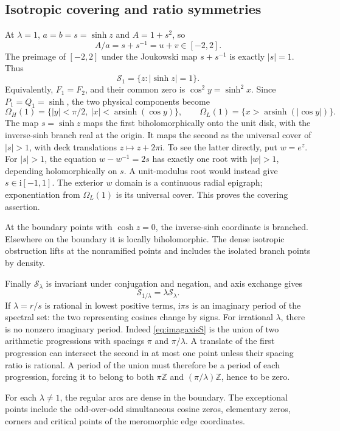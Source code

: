 \documentclass[11pt]{article}
\numberwithin{equation}{section}
\theoremstyle{definition}
\newcommand{\Z}{\mathbb Z}
\newcommand{\ii}{\mathrm i}
\newcommand{\cS}{\mathcal S}
\newcommand{\OH}{\Omega_H}
\newcommand{\OL}{\Omega_L}
\begin{document}
\subsection{Isotropic covering and ratio symmetries}

At \(\lambda=1\), \(a=b=s=\sinh z\) and \(A=1+s^2\), so
\[
 A/a=s+s^{-1}=u+v\in[-2,2].
\]
The preimage of \([-2,2]\) under the Joukowski map \(s+s^{-1}\)
is exactly \(|s|=1\). Thus
\begin{equation}\label{eq:isotropicgeometry}
 \cS_1=\{z:|\sinh z|=1\}.
\end{equation}
Equivalently, \(F_1=F_2\), and their common zero is
\(\cos^2 y=\sinh^2x\). Since \(P_1=Q_1=\sinh\), the two physical
components become
\[
 \OH(1)=\{|y|<\pi/2,\ |x|<\operatorname{arsinh}(\cos y)\},
 \qquad
 \OL(1)=\{x>\operatorname{arsinh}(|\cos y|)\}.
\]
The map \(s=\sinh z\) maps the first biholomorphically onto the unit
disk, with the inverse-sinh branch real at the origin. It maps the
second as the universal cover of \(|s|>1\), with deck translations
\(z\mapsto z+2\pi\ii\). To see the latter directly, put \(w=e^z\).
For \(|s|>1\), the equation \(w-w^{-1}=2s\) has exactly one root
with \(|w|>1\), depending holomorphically on \(s\). A unit-modulus
root would instead give \(s\in\ii[-1,1]\). The exterior \(w\) domain
is a continuous radial epigraph; exponentiation from \(\OL(1)\)
is its universal cover. This proves the covering assertion.

At the boundary points with \(\cosh z=0\), the inverse-sinh coordinate
is branched. Elsewhere on the boundary it is locally biholomorphic.
The dense isotropic obstruction lifts at the nonramified points and
includes the isolated branch points by density.

Finally \(\cS_\lambda\) is invariant under conjugation and negation,
and axis exchange gives
\[
 \cS_{1/\lambda}=\lambda\cS_\lambda.
\]
If \(\lambda=r/s\) is rational in lowest positive terms,
\(\ii\pi s\) is an imaginary period of the spectral set: the two
representing cosines change by signs.
For irrational \(\lambda\), there is no nonzero imaginary period.
Indeed \eqref{eq:imagaxisS} is the union of two arithmetic progressions
with spacings \(\pi\) and \(\pi/\lambda\). A translate of the first
progression can intersect the second in at most one point unless
their spacing ratio is rational. A period of the union must therefore
be a period of each progression, forcing it to belong to both
\(\pi\Z\) and \((\pi/\lambda)\Z\), hence to be zero.

For each \(\lambda\ne1\), the regular arcs are dense in the boundary.
The exceptional points include the odd-over-odd simultaneous cosine
zeros, elementary zeros, corners and critical points of the
meromorphic edge coordinates.
\end{document}
